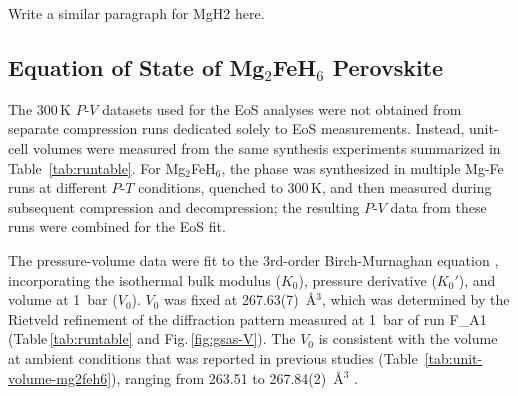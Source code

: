 \documentclass[draft,jgrga,12pt]{agujournal2019}
\begin{document}
\begin{cbox}
    Write a similar paragraph for MgH2 here.
\end{cbox}

\subsection{Equation of State of Mg$_2$FeH$_6$ Perovskite}


The 300\,K $P$-$V$ datasets used for the EoS analyses were not obtained from separate compression runs dedicated solely to EoS measurements. 
Instead, unit-cell volumes were measured from the same synthesis experiments summarized in Table~\ref{tab:runtable}. 
For Mg$_2$FeH$_6$, the phase was synthesized in multiple Mg-Fe runs at different $P$-$T$ conditions, quenched to 300\,K, and then measured during subsequent compression and decompression; the resulting $P$-$V$ data from these runs were combined for the EoS fit. 

 
The pressure-volume data were fit to {the} 3rd-order Birch-Murnaghan equation \cite{birch_elasticity_1952}, incorporating the isothermal bulk modulus ($K_0$), pressure derivative ($K_{0}'$), and volume at 1~bar ($V_0$). 
$V_0$ was fixed at 267.63(7)~\AA$^3$, which was determined by the Rietveld refinement of the diffraction pattern measured at 1~bar of run F\_A1 (Table\,\ref{tab:runtable} and Fig.\,\ref{fig:gsas-V}). 
The $V_0$ is consistent with the volume at ambient conditions that was reported in previous studies (Table~\ref{tab:unit-volume-mg2feh6}), ranging from 263.51 to 267.84(2)~\AA$^3$ \cite{george_bulk_2009, zhou_structural_2011, polanski_mg2feh6_2019, lang_insitu_2017, retuerto_neutron_2015, zareii_structural_2012, wang_preparation_2010, retuerto_highpressure_2010}. 
\end{document}
